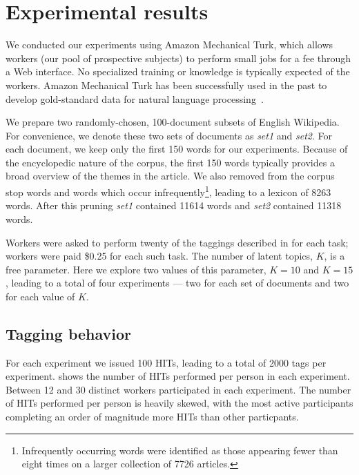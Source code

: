 \section{Experimental results}
\label{sec:experiments}

We conducted our experiments using Amazon Mechanical Turk, which
allows workers (our pool of prospective subjects) to perform small
jobs for a fee through a Web interface.  No specialized training or
knowledge is typically expected of the workers.  Amazon Mechanical
Turk has been successfully used in the past to develop gold-standard
data for natural language processing~\cite{snow-08}.

We prepare two randomly-chosen, 100-document subsets of English
Wikipedia.  For convenience, we
denote these two sets of documents as \emph{set1} and \emph{set2}.
For each document, we keep only the first 150 words for our
experiments.  Because of the encyclopedic nature of the corpus, the
first 150 words typically provides a broad overview of the themes in
the article.  We also removed from the corpus stop words and words
which occur infrequently\footnote{Infrequently occurring words were
  identified as those appearing fewer than eight times on a larger
  collection of 7726 articles.}, leading to a lexicon of 8263 words.
After this pruning \emph{set1} contained 11614 words and \emph{set2}
contained 11318 words.

Workers were asked to perform twenty of the taggings described in
 for each task; workers were paid \$0.25 for each
such task.  The number of latent topics, $K$, is a free parameter.
Here we explore two values of this parameter, $K=10$ and $K=15$,
leading to a total of four experiments --- two for each set of
documents and two for each value of $K$.

\subsection{Tagging behavior}
For each experiment we issued 100 HITs, leading to a total of 2000
tags per experiment.   shows the number of HITs
performed per person in each experiment.  Between 12 and 30 distinct
workers participated in each experiment.  The number of HITs performed
per person is heavily skewed, with the most active participants
completing an order of magnitude more HITs than other particpants.

